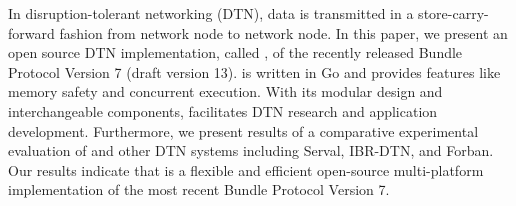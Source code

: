In disruption-tolerant networking (DTN), data is transmitted in a store-carry-forward fashion from network node to network node. 
In this paper, we present an open source DTN implementation, called \dtn, of the recently released Bundle Protocol Version 7 (draft version 13).
\dtn is written in Go and provides features like memory safety and concurrent execution.
With its modular design and interchangeable components, \dtn facilitates DTN research and application development.
Furthermore, we present results of a comparative experimental evaluation of \dtn and other DTN systems including Serval, IBR-DTN, and Forban. 
Our results indicate that \dtn is a flexible and efficient open-source multi-platform implementation of the most recent Bundle Protocol Version 7.

 